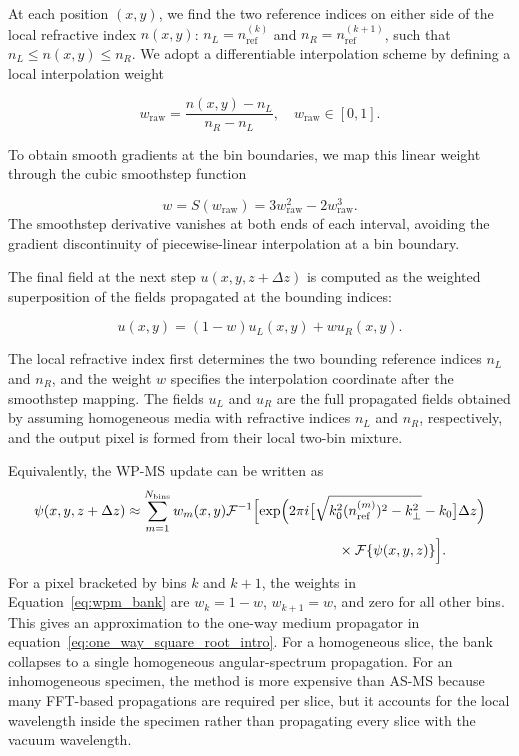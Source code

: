 \documentclass[preprint,12pt,number]{elsarticle}
\begin{document}
At each position $(x,y)$, we find the two reference indices on either side of
the local refractive index $n(x,y)$: $n_L=n_{\mathrm{ref}}^{(k)}$ and
$n_R=n_{\mathrm{ref}}^{(k+1)}$, such that $n_L \le n(x,y) \le n_R$. We adopt a
differentiable interpolation scheme by defining a local interpolation weight

\begin{equation}
\label{eq:wpm_raw_weight}
w_{\mathrm{raw}} = \frac{n(x,y) - n_L}{n_R - n_L}, \quad w_{\mathrm{raw}} \in [0, 1].
\end{equation}

To obtain smooth gradients at the bin boundaries, we map this linear weight
through the cubic smoothstep function

\begin{equation}
\label{eq:wpm_smoothstep}
w = S(w_{\mathrm{raw}}) = 3w_{\mathrm{raw}}^2 - 2w_{\mathrm{raw}}^3.
\end{equation}
The smoothstep derivative vanishes at both ends of each interval, avoiding the
gradient discontinuity of piecewise-linear interpolation at a bin boundary.

The final field at the next step $u(x,y,z+\Delta z)$ is computed as the
weighted superposition of the fields propagated at the bounding indices:

\begin{equation}
\label{eq:wpm_two_bin_interpolation}
u(x,y) = (1 - w)u_L(x,y) + w u_R(x,y).
\end{equation}

The local refractive index first determines the two bounding reference
indices $n_L$ and $n_R$, and the weight $w$ specifies the interpolation
coordinate after the smoothstep mapping. The fields
$u_L$ and $u_R$ are the full propagated fields obtained by assuming homogeneous
media with refractive indices $n_L$ and $n_R$, respectively, and the output
pixel is formed from their local two-bin mixture. 

Equivalently, the WP-MS update can be written as
\begin{equation}
\label{eq:wpm_bank}
\begin{aligned}
\psi(x,y,z+\Delta z)
&\approx
\sum_{m=1}^{N_{\mathrm{bins}}} w_m(x,y)
\mathcal F^{-1}
\Bigl[
\exp\Bigl(
2\pi i
\bigl[
\sqrt{k_0^2(n_{\mathrm{ref}}^{(m)})^2-k_\perp^2}
-k_0
\bigr]\Delta z
\Bigr)
\\
&\hspace{0.44\textwidth}
\times \mathcal F\{\psi(x,y,z)\}
\Bigr].
\end{aligned}
\end{equation}
For a pixel bracketed by bins $k$ and $k+1$, the weights in
Equation~\eqref{eq:wpm_bank} are $w_k=1-w$, $w_{k+1}=w$, and zero for all
other bins.
This gives an approximation to the one-way medium propagator in
equation~\eqref{eq:one_way_square_root_intro}. For a homogeneous slice, the
bank collapses to a single homogeneous angular-spectrum propagation. For an
inhomogeneous specimen, the method is more expensive
than AS-MS because many FFT-based propagations are required per slice, but it
accounts for the local wavelength inside the specimen rather than propagating
every slice with the vacuum wavelength.
\end{document}
